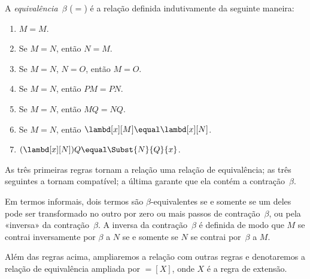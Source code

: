 \documentclass[../../../include/open-logic-section]{subfiles}
\begin{document}
\begin{defn}
  A \emph{equivalência~$\beta$} ($\equal$) é a relação definida
  indutivamente da seguinte maneira:
  \begin{enumerate}
  \item $M \equal M$.
  \item Se $M \equal N$, então $N \equal M$.
  \item Se $M \equal N$, $N \equal O$, então $M \equal O$.
  \item Se $M \equal N$, então $PM \equal PN$.
  \item Se $M \equal N$, então $MQ \equal NQ$.
  \item Se $M \equal N$, então $\lambd[x][M] \equal \lambd[x][N]$.
  \item $(\lambd[x][N])Q \equal \Subst{N}{Q}{x}$.
  \end{enumerate}
\end{defn}

As três primeiras regras tornam a relação uma relação de equivalência; as
três seguintes a tornam compatível; a última garante que ela contém a
contração~$\beta$.

Em termos informais, dois termos são $\beta$-equivalentes se e somente se um
deles pode ser transformado no outro por zero ou mais passos de
contração~$\beta$, ou pela «inversa» da contração~$\beta$. A inversa da
contração~$\beta$ é definida de modo que $M$ se contrai inversamente por
$\beta$ a $N$ se e somente se $N$ se contrai por~$\beta$ a $M$.

Além das regras acima, ampliaremos a relação com outras regras e denotaremos a
relação de equivalência ampliada por $\equal[X]$, onde $X$ é a regra de
extensão.
\end{document}
